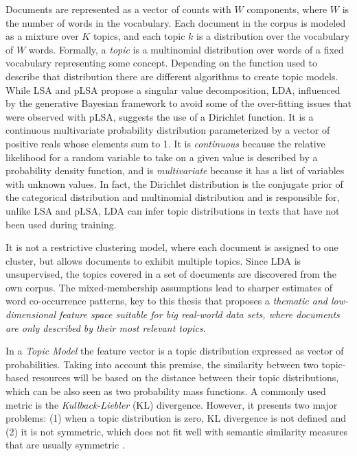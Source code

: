 Documents are represented as a vector of counts with $W$ components, where $W$ is the number of words in the vocabulary. Each document in the corpus is modeled as a mixture over $K$ topics, and each topic $k$ is a distribution over the vocabulary of $W$ words. Formally, a \textit{topic} is a multinomial distribution over words of a fixed vocabulary representing some concept. Depending on the function used to describe that distribution there are different algorithms to create topic models. While LSA and pLSA propose a singular value decomposition, LDA, influenced by the generative Bayesian framework to avoid some of the over-fitting issues that were observed with pLSA, suggests the use of a Dirichlet function. It is a continuous multivariate probability distribution parameterized by a vector of positive reals whose elements sum to 1.  It is \textit{continuous} because the relative likelihood for a random variable to take on a given value is described by a probability density function, and is \textit{multivariate} because it has a list of variables with unknown values. In fact, the Dirichlet distribution is the conjugate prior of the categorical distribution and multinomial distribution and is responsible for, unlike LSA and pLSA, LDA can infer topic distributions in texts that have not been used during training.

It is not a restrictive clustering model, where each document is assigned to one cluster, but allows documents to exhibit multiple topics. Since LDA is unsupervised, the topics covered in a set of documents are discovered from the own corpus. The mixed-membership assumptions lead to sharper estimates of word co-occurrence patterns, key to this thesis that proposes a \textit{thematic and low-dimensional feature space suitable for big real-world data sets, where documents are only described by their most relevant topics}.

In a \textit{Topic Model} the feature vector is a topic distribution expressed as vector of probabilities. Taking into account this premise, the similarity between two topic-based resources will be based on the distance between their topic distributions, which can be also seen as two probability mass functions. A commonly used metric is the \textit{Kullback-Liebler} (KL) divergence. However, it presents two major problems: (1) when a topic distribution is zero, KL divergence is not defined and (2) it is not symmetric, which does not fit well with semantic similarity measures that are usually symmetric \cite{Rus2013}.

